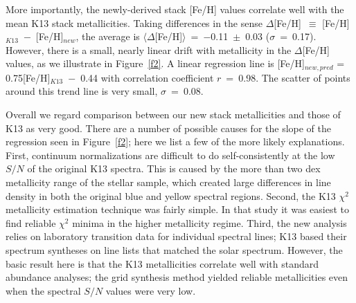 \documentclass[preprint]{aastex6}
\begin{document}
More importantly, the newly-derived stack [Fe/H] values correlate well 
with the mean K13 stack metallicities.
Taking differences in the sense 
$\Delta$[Fe/H]~$\equiv$ [Fe/H]$_{K13}$~$-$~[Fe/H]$_{new}$,
the average is $\langle\Delta$[Fe/H]$\rangle$~=~$-$0.11~$\pm$~0.03
($\sigma$~=~0.17).
However, there is a small, nearly linear drift with metallicity in 
the $\Delta$[Fe/H] values, as we illustrate in Figure~\ref{f2}.
A linear regression line is [Fe/H]$_{new,pred}$ = 0.75[Fe/H]$_{K13}$~$-$~0.44
with correlation coefficient $r$~=~0.98.
The scatter of points around this trend line is very small, $\sigma$~=~0.08.

Overall we regard comparison between our new stack metallicities and those
of K13 as very good.
There are a number of possible causes for the slope of the regression seen 
in Figure~\ref{f2}; here we list a few of the more likely explanations.
First, continuum normalizations are difficult to do self-consistently at
the low $S/N$ of the original K13 spectra.  
This is caused by the more than two dex metallicity range of the stellar
sample, which created large differences in line density in both the original
blue and yellow spectral regions.
Second, the K13 $\chi^2$ metallicity estimation technique was fairly simple. 
In that study it was easiest to find reliable $\chi^2$ minima in the 
higher metallicity regime.
Third, the new analysis relies on laboratory transition data for individual
spectral lines; K13 based their spectrum syntheses on line lists that
matched the solar spectrum.
However, the basic result here is that the K13 metallicities correlate
well with standard abundance analyses; the grid synthesis method yielded 
reliable metallicities even when the spectral $S/N$ values were very low.
\end{document}
